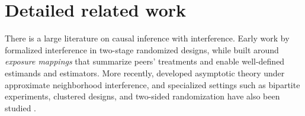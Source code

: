\documentclass{article}
\theoremstyle{plain}
\theoremstyle{definition}
\theoremstyle{remark}
\begin{document}
















\appendix
\section{Detailed related work}\label{app:related-work}
There is a large literature on causal inference with interference. Early work by \citet{hudgens2008toward} formalized interference in two-stage randomized designs, while \citet{aronow2017estimating} built around \emph{exposure mappings} that summarize peers’ treatments
and enable well-defined estimands and estimators. More recently, \citep{leung2022causal, gao2023causal} developed asymptotic theory under approximate neighborhood interference, and specialized settings such as bipartite experiments, clustered designs, and two-sided randomization have also been studied \citep{papadogeorgou2025causal, lu2025design, su2021model, Masoero2026multiple}.
\end{document}
